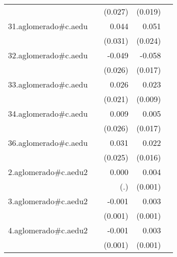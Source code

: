 {\begin{longtable}{l*{4}{D{.}{.}{-1}}}
            &                     &     (0.027)         &     (0.019)         &                     \\
\addlinespace
31.aglomerado#c.aedu&                     &       0.044         &       0.051\sym{*}  &                     \\
            &                     &     (0.031)         &     (0.024)         &                     \\
\addlinespace
32.aglomerado#c.aedu&                     &      -0.049         &      -0.058\sym{***}&                     \\
            &                     &     (0.026)         &     (0.017)         &                     \\
\addlinespace
33.aglomerado#c.aedu&                     &       0.026         &       0.023\sym{*}  &                     \\
            &                     &     (0.021)         &     (0.009)         &                     \\
\addlinespace
34.aglomerado#c.aedu&                     &       0.009         &       0.005         &                     \\
            &                     &     (0.026)         &     (0.017)         &                     \\
\addlinespace
36.aglomerado#c.aedu&                     &       0.031         &       0.022         &                     \\
            &                     &     (0.025)         &     (0.016)         &                     \\
\addlinespace
2.aglomerado#c.aedu2&                     &       0.000         &       0.004\sym{***}&                     \\
            &                     &         (.)         &     (0.001)         &                     \\
\addlinespace
3.aglomerado#c.aedu2&                     &      -0.001         &       0.003\sym{**} &                     \\
            &                     &     (0.001)         &     (0.001)         &                     \\
\addlinespace
4.aglomerado#c.aedu2&                     &      -0.001         &       0.003\sym{***}&                     \\
            &                     &     (0.001)         &     (0.001)         &                     \\

\end{longtable}}

